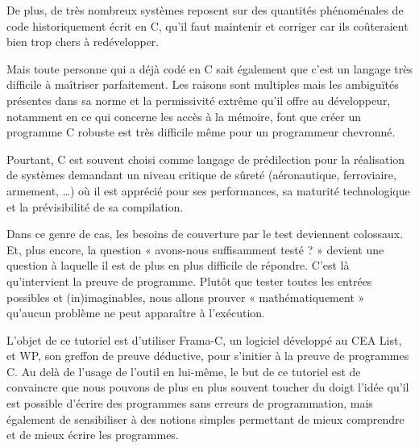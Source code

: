 \documentclass[12pt,francais,]{scrbook}
\begin{document}
De plus, de très nombreux systèmes reposent sur des quantités
phénoménales de code historiquement écrit en C, qu'il faut maintenir et
corriger car ils coûteraient bien trop chers à redévelopper.

Mais toute personne qui a déjà codé en C sait également que c'est un
langage très difficile à maîtriser parfaitement. Les raisons sont
multiples mais les ambiguïtés présentes dans sa norme et la permissivité
extrême qu'il offre au développeur, notamment en ce qui concerne les
accès à la mémoire, font que créer un programme C robuste est très
difficile même pour un programmeur chevronné.

Pourtant, C est souvent choisi comme langage de prédilection pour la
réalisation de systèmes demandant un niveau critique de sûreté
(aéronautique, ferroviaire, armement, \ldots{}) où il est apprécié pour
ses performances, sa maturité technologique et la prévisibilité de sa
compilation.

Dans ce genre de cas, les besoins de couverture par le test deviennent
colossaux. Et, plus encore, la question « avons-nous suffisamment testé
? » devient une question à laquelle il est de plus en plus difficile de
répondre. C'est là qu'intervient la preuve de programme. Plutôt que
tester toutes les entrées possibles et (in)imaginables, nous allons
prouver « mathématiquement » qu'aucun problème ne peut apparaître à
l'exécution.

L'objet de ce tutoriel est d'utiliser Frama-C, un logiciel développé au
CEA List, et WP, son greffon de preuve déductive, pour s'initier à la
preuve de programmes C. Au delà de l'usage de l'outil en lui-même, le
but de ce tutoriel est de convaincre que nous pouvons de plus en plus
souvent toucher du doigt l'idée qu'il est possible d'écrire des
programmes sans erreurs de programmation, mais également de sensibiliser
à des notions simples permettant de mieux comprendre et de mieux écrire
les programmes.
\end{document}
